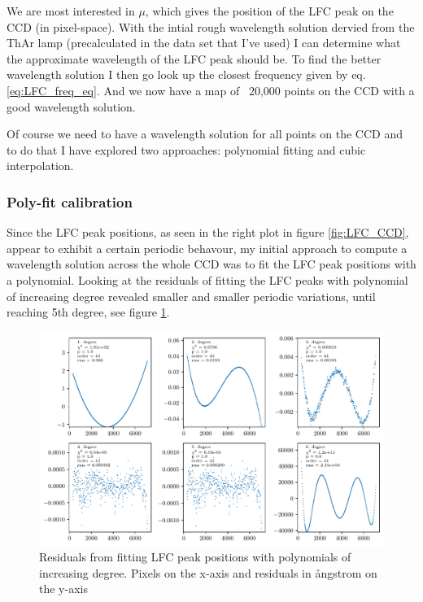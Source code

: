     We are most interested in $\mu$, which gives the position of the LFC peak on the CCD (in pixel-space). With the intial rough wavelength solution dervied from the ThAr lamp (precalculated in the data set that I've used) I can determine what the approximate wavelength of the LFC peak should be. To find the better wavelength solution I then go look up the closest frequency given by eq. \ref{eq:LFC_freq_eq}. And we now have a map of ~20,000 points on the CCD with a good wavelength solution. 
    
    Of course we need to have a wavelength solution for all points on the CCD and to do that I have explored two approaches: polynomial fitting and cubic interpolation.
    
    \subsubsection{Poly-fit calibration}
    Since the LFC peak positions, as seen in the right plot in figure \ref{fig:LFC_CCD}, appear to exhibit a certain periodic behavour, my initial approach to compute a wavelength solution across the whole CCD was to fit the LFC peak positions with a polynomial. Looking at the residuals of fitting the LFC peaks with polynomial of increasing degree revealed smaller and smaller periodic variations, until reaching 5th degree, see figure \ref{fig:LFC_calib_poly_degrees}. 

    \begin{figure}%
        \begin{wide}  
            \includegraphics[width=\textwidth]{figures/calib/calib_poly_fit_degrees_order44_residuals_ang.pdf}
            \caption{Residuals from fitting LFC peak positions with polynomials of increasing degree. Pixels on the x-axis and residuals in ångstrom on the y-axis}
            \label{fig:LFC_calib_poly_degrees}
        \end{wide}
    \end{figure}

